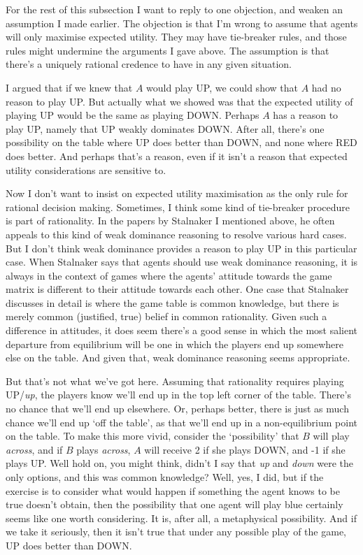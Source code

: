 \documentclass[11pt,]{book}
\begin{document}
For the rest of this subsection I want to reply to one objection, and weaken an assumption I made earlier. The objection is that I'm wrong to assume that agents will only maximise expected utility. They may have tie-breaker rules, and those rules might undermine the arguments I gave above. The assumption is that there's a uniquely rational credence to have in any given situation.

I argued that if we knew that \(A\) would play UP, we could show that \(A\) had no reason to play UP. But actually what we showed was that the expected utility of playing UP would be the same as playing DOWN. Perhaps \(A\) has a reason to play UP, namely that UP weakly dominates DOWN. After all, there's one possibility on the table where UP does better than DOWN, and none where RED does better. And perhaps that's a reason, even if it isn't a reason that expected utility considerations are sensitive to.

Now I don't want to insist on expected utility maximisation as the only rule for rational decision making. Sometimes, I think some kind of tie-breaker procedure is part of rationality. In the papers by Stalnaker I mentioned above, he often appeals to this kind of weak dominance reasoning to resolve various hard cases. But I don't think weak dominance provides a reason to play UP in this particular case. When Stalnaker says that agents should use weak dominance reasoning, it is always in the context of games where the agents' attitude towards the game matrix is different to their attitude towards each other. One case that Stalnaker discusses in detail is where the game table is common knowledge, but there is merely common (justified, true) belief in common rationality. Given such a difference in attitudes, it does seem there's a good sense in which the most salient departure from equilibrium will be one in which the players end up somewhere else on the table. And given that, weak dominance reasoning seems appropriate.

But that's not what we've got here. Assuming that rationality requires playing UP/\emph{up}, the players know we'll end up in the top left corner of the table. There's no chance that we'll end up elsewhere. Or, perhaps better, there is just as much chance we'll end up `off the table', as that we'll end up in a non-equilibrium point on the table. To make this more vivid, consider the `possibility' that \(B\) will play \emph{across}, and if \(B\) plays \emph{across}, \(A\) will receive 2 if she plays DOWN, and -1 if she plays UP. Well hold on, you might think, didn't I say that \emph{up} and \emph{down} were the only options, and this was common knowledge? Well, yes, I did, but if the exercise is to consider what would happen if something the agent knows to be true doesn't obtain, then the possibility that one agent will play blue certainly seems like one worth considering. It is, after all, a metaphysical possibility. And if we take it seriously, then it isn't true that under any possible play of the game, UP does better than DOWN.
\end{document}
